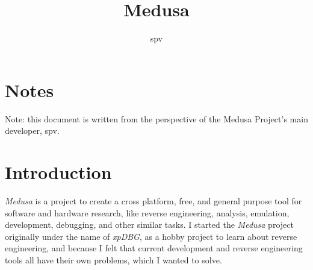 \documentclass{article}
\title{Medusa}
\author{spv}
\begin{document}
	\maketitle

	\section{Notes}
	Note: this document is written from the perspective of the Medusa Project's
	main developer, spv.

	\section{Introduction}
	\textit{Medusa} is a project to create a cross platform, free, and general
	purpose tool for software and hardware research, like reverse engineering,
	analysis, emulation, development, debugging, and other similar tasks. I
	started the \textit{Medusa} project originally under the name of
	\textit{xpDBG}, as a hobby project to learn about reverse engineering, and
	because I felt that current development and reverse engineering tools all
	have their own problems, which I wanted to solve.
\end{document}
